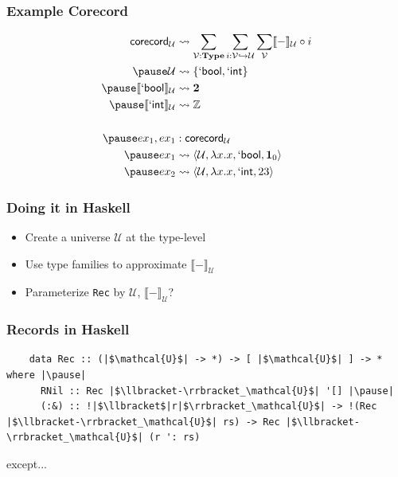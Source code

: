 \documentclass[12pt]{beamer}
\begin{document}
\begin{frame}
  \frametitle{Example Corecord}
  \[
    \begin{aligned}
      \mathsf{corecord}_\mathcal{U} &\leadsto
        \sum_{\mathcal{V}:\mathbf{Type}}
        \sum_{i:\mathcal{V}\hookrightarrow\mathcal{U}}
        \sum_\mathcal{V} \llbracket-\rrbracket_\mathcal{U}\circ i\\ \pause
      \mathcal{U} &\leadsto \{ \mathsf{`bool}, \mathsf{`int} \}\\ \pause
      \llbracket\mathsf{`bool}\rrbracket_\mathcal{U} &\leadsto \mathbf{2}\\ \pause
      \llbracket\mathsf{`int}\rrbracket_\mathcal{U} &\leadsto \mathbb{Z}\\\\ \pause
      ex_1, ex_1 &: \mathsf{corecord}_\mathcal{U}\\ \pause
      ex_1 &\leadsto \langle\mathcal{U}, \lambda x.x, \mathsf{`bool}, \mathbf{1}_0\rangle\\ \pause
      ex_2 &\leadsto \langle\mathcal{U}, \lambda x.x, \mathsf{`int}, 23\rangle
    \end{aligned}
  \]
\end{frame}

\begin{frame}
  \frametitle{Doing it in Haskell}
  \pause
  \begin{itemize}
    \item Create a universe $\mathcal{U}$ at the type-level \pause
    \item Use type families to approximate $\llbracket-\rrbracket_\mathcal{U}$ \pause
    \item Parameterize \lstinline{Rec} by $\mathcal{U}$, $\llbracket-\rrbracket_\mathcal{U}$?
  \end{itemize}
\end{frame}

\begin{frame}[fragile]
  \frametitle{Records in Haskell}
  \begin{lstlisting}
    data Rec :: (|$\mathcal{U}$| -> *) -> [ |$\mathcal{U}$| ] -> * where |\pause|
      RNil :: Rec |$\llbracket-\rrbracket_\mathcal{U}$| '[] |\pause|
      (:&) :: !|$\llbracket$|r|$\rrbracket_\mathcal{U}$| -> !(Rec |$\llbracket-\rrbracket_\mathcal{U}$| rs) -> Rec |$\llbracket-\rrbracket_\mathcal{U}$| (r ': rs)
  \end{lstlisting}

  \bigskip
  \pause
  \centerline{except...}
\end{frame}
\end{document}

